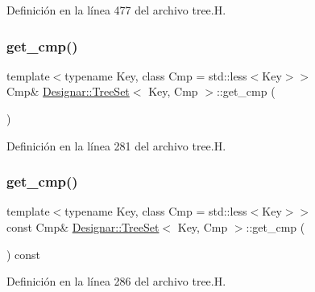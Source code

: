Definición en la línea 477 del archivo tree.\+H.

\mbox{\label{class_designar_1_1_tree_set_aec12ad907a431f411eb06b0643ba9d53}} 
\subsubsection{\texorpdfstring{get\+\_\+cmp()}{get\_cmp()}\hspace{0.1cm}{\footnotesize\ttfamily [1/2]}}
{\footnotesize\ttfamily template$<$typename Key, class Cmp = std\+::less$<$\+Key$>$$>$ \\
Cmp\& \hyperlink{class_designar_1_1_tree_set}{Designar\+::\+Tree\+Set}$<$ Key, Cmp $>$\+::get\+\_\+cmp (\begin{DoxyParamCaption}{ }\end{DoxyParamCaption})\hspace{0.3cm}{\ttfamily [inline]}}



Definición en la línea 281 del archivo tree.\+H.

\mbox{\label{class_designar_1_1_tree_set_ae1a8289ce177e865d9987f896038a289}} 
\subsubsection{\texorpdfstring{get\+\_\+cmp()}{get\_cmp()}\hspace{0.1cm}{\footnotesize\ttfamily [2/2]}}
{\footnotesize\ttfamily template$<$typename Key, class Cmp = std\+::less$<$\+Key$>$$>$ \\
const Cmp\& \hyperlink{class_designar_1_1_tree_set}{Designar\+::\+Tree\+Set}$<$ Key, Cmp $>$\+::get\+\_\+cmp (\begin{DoxyParamCaption}{ }\end{DoxyParamCaption}) const\hspace{0.3cm}{\ttfamily [inline]}}



Definición en la línea 286 del archivo tree.\+H.

\mbox{\label{class_designar_1_1_tree_set_a4533e89f7cea7d9a6494d443863a3223}} 
